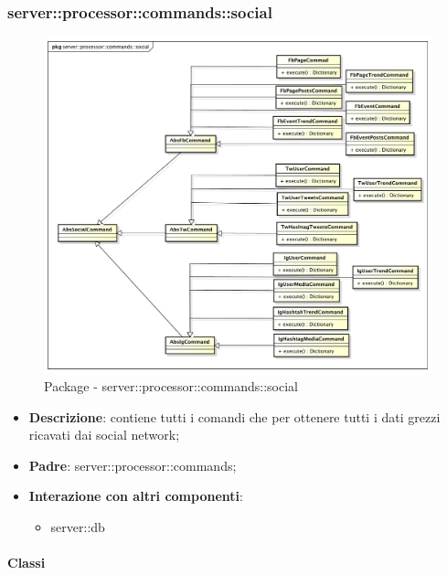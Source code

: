       \subsubsection{server::processor::commands::social} %
      \label{ssub:bdsm_app_server_processor_commands_social}
      \begin{figure}[!htbp]
      	\centering
      	\centerline{\includegraphics[scale=0.4]{./images/server/social.pdf}}
      	\caption{Package - server::processor::commands::social}
      \end{figure}

      \begin{itemize}
        \item \textbf{Descrizione}: contiene tutti i comandi che per ottenere tutti i dati grezzi ricavati dai social network;
        \item \textbf{Padre}: server::processor::commands;
        \item \textbf{Interazione con altri componenti}:
          \begin{itemize}
            \item server::db
          \end{itemize}
      \end{itemize}

        \paragraph{Classi} %

